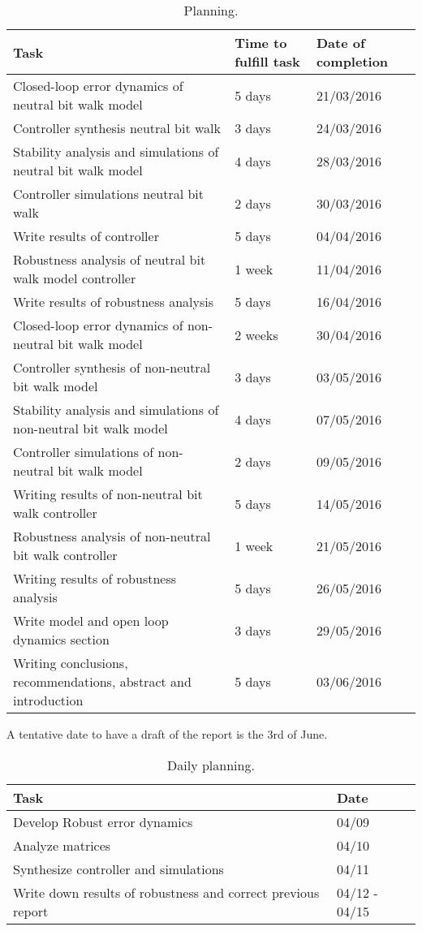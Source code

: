 \documentclass[main.tex]{subfiles}
\begin{document}
\begin{table}[H]
\caption{Planning.}
\centering
\begin{tabular}{|l|l|l|}
\hline
Task &Time to fulfill task& Date of completion  \\ \hline
Closed-loop error dynamics of neutral bit walk model & 5 days &  21/03/2016\\ 
Controller synthesis neutral bit walk  & 3 days & 24/03/2016\\ 
Stability analysis and simulations of neutral bit walk model&4 days & 28/03/2016\\ 
Controller simulations neutral bit walk& 2 days & 30/03/2016\\ 
Write results of controller & 5 days & 04/04/2016\\
Robustness analysis of neutral bit walk model controller &1 week & 11/04/2016\\
Write  results of robustness analysis & 5 days & 16/04/2016\\
Closed-loop error dynamics of non-neutral bit walk model &2 weeks & 30/04/2016\\ 
Controller synthesis of non-neutral bit walk model &3 days & 03/05/2016 \\ 
Stability analysis and simulations of non-neutral bit walk model &4 days & 07/05/2016 \\ 
Controller simulations of non-neutral bit walk model &2 days & 09/05/2016 \\ 
Writing results of non-neutral bit walk controller &5 days & 14/05/2016 \\
Robustness analysis of non-neutral bit walk controller & 1 week & 21/05/2016\\
Writing results of robustness analysis & 5 days & 26/05/2016\\
Write model and open loop dynamics section & 3 days & 29/05/2016 \\
Writing conclusions, recommendations, abstract and introduction & 5 days & 03/06/2016\\ \hline
\end{tabular}
\label{tab:Planning}
\end{table}

A tentative date to have a draft of the report is the 3rd of June.

\begin{table}[H]
	\caption{Daily planning.}
	\centering
	\begin{tabular}{|l|l||}
		\hline
		Task & Date\\ \hline
		Develop Robust error dynamics & 04/09\\ 
		Analyze matrices  & 04/10 \\ 
		Synthesize controller and simulations & 04/11\\ 
		Write down results of robustness and correct previous report & 04/12 - 04/15\\ \hline
	\end{tabular}
	\label{tab:Planning}
\end{table}
\end{document}
